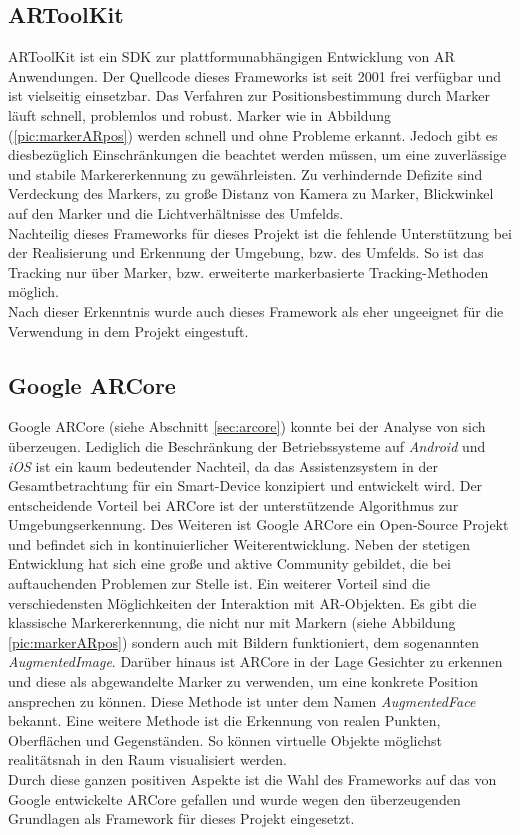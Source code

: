 \subsection{ARToolKit}
ARToolKit ist ein \acs{SDK} zur plattformunabhängigen Entwicklung von \acl{AR} Anwendungen. Der Quellcode dieses Frameworks ist seit 2001 
frei verfügbar und ist vielseitig einsetzbar. Das Verfahren zur Positionsbestimmung durch Marker läuft schnell, problemlos und robust. Marker wie in 
Abbildung (\ref{pic:markerARpos}) werden schnell und ohne Probleme erkannt. Jedoch gibt es diesbezüglich Einschränkungen die beachtet werden 
müssen, um eine zuverlässige und stabile Markererkennung zu gewährleisten. Zu verhindernde Defizite sind Verdeckung des Markers, zu große Distanz 
von Kamera zu Marker, Blickwinkel auf den Marker und die Lichtverhältnisse des Umfelds. 
\\ 
Nachteilig dieses Frameworks für dieses Projekt ist die fehlende Unterstützung bei der Realisierung und Erkennung der Umgebung, bzw. des Umfelds.
So ist das Tracking nur über Marker, bzw. erweiterte markerbasierte Tracking-Methoden möglich. 
\\ %
Nach dieser Erkenntnis wurde auch dieses Framework als eher ungeeignet für die Verwendung in dem Projekt eingestuft. %
\subsection{Google ARCore}
Google ARCore (siehe Abschnitt \ref{sec:arcore}) konnte bei der Analyse von sich überzeugen. Lediglich die Beschränkung der
Betriebssysteme auf \textit{Android} und \textit{iOS} ist ein kaum bedeutender Nachteil, da das Assistenzsystem in der Gesamtbetrachtung 
für ein Smart-Device konzipiert und entwickelt wird. Der entscheidende Vorteil bei 
ARCore ist der unterstützende Algorithmus zur Umgebungserkennung. Des Weiteren ist Google ARCore ein Open-Source Projekt und befindet sich 
in kontinuierlicher Weiterentwicklung. Neben der stetigen Entwicklung hat sich eine große und aktive Community gebildet, die bei auftauchenden 
Problemen zur Stelle ist. Ein weiterer Vorteil sind die verschiedensten Möglichkeiten der Interaktion mit \acs{AR}-Objekten. Es gibt die 
klassische Markererkennung, die nicht nur mit Markern (siehe Abbildung \ref{pic:markerARpos}) sondern auch mit Bildern funktioniert, dem sogenannten
\textit{AugmentedImage}. Darüber hinaus ist ARCore in der Lage Gesichter zu erkennen und diese als abgewandelte Marker zu verwenden, um eine konkrete 
Position ansprechen zu können. Diese Methode ist unter dem Namen \textit{AugmentedFace} bekannt. Eine weitere Methode ist die Erkennung von 
realen Punkten, Oberflächen und Gegenständen. So können virtuelle Objekte möglichst realitätsnah in den Raum visualisiert werden.
\\
\linebreak
Durch diese ganzen positiven Aspekte ist die Wahl des Frameworks auf das von Google entwickelte ARCore gefallen und wurde wegen den überzeugenden 
Grundlagen als Framework für dieses Projekt eingesetzt.

